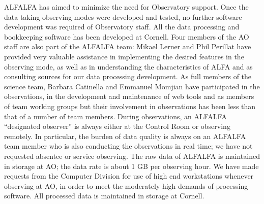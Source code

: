ALFALFA has aimed to minimize the need for Observatory support. Once the 
data taking observing modes were developed and tested, no further software
development was required of Observatory staff. All the data processing
and bookkeeping software has been developed at Cornell. Four members of the
AO staff are also part of the ALFALFA team: Mikael Lerner and Phil Perillat
have provided very valuable assistance in implementing the desired features
in the observing mode, as well as in understanding the characteristics of
ALFA and as consulting sources for our data processing development. As
full members of the science team, Barbara
Catinella and Emmanuel Momjian have participated in the observations, in the
development and maintenance of web tools and as members of team working
groups but their involvement in observations has been less than that of a number
of team members. During observations, an ALFALFA ``designated
observer'' is always either at the Control Room or observing remotely. In
particular, the burden of data quality is always on an ALFALFA team member
who is also conducting the observations in real time; we have not requested 
absentee or service observing. The raw data of ALFALFA is maintained 
in storage at AO; the data rate is about 1 GB per observing hour. We have
made requests from the Computer Division for use of high end workstations  
whenever observing at AO, in order to meet the moderately high demands of
processing software. All processed data is maintained in storage at Cornell.


